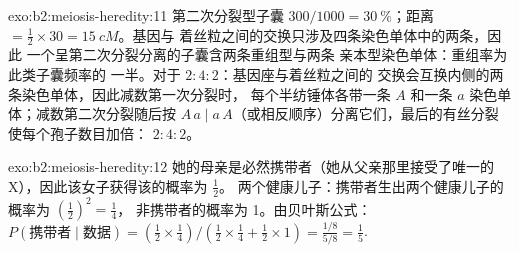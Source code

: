 \begin{solution}{exo:b2:meiosis-heredity:11}
第二次分裂型子囊 $300/1000 = \qty{30}{\%}$；距离 $=
\tfrac12\times 30 = \qty{15}{cM}$。基因与
着丝粒之间的交换只涉及四条染色单体中的两条，因此
一个呈第二次分裂分离的子囊含两条重组型与两条
亲本型染色单体：重组率为此类子囊频率的
一半。对于 $2 : 4 : 2$：基因座与着丝粒之间的
交换会互换内侧的两条染色单体，因此减数第一次分裂时，
每个半纺锤体各带一条 $A$ 和一条 $a$
染色单体；减数第二次分裂随后按 $A\,a \mid
a\,A$（或相反顺序）分离它们，最后的有丝分裂使每个孢子数目加倍：
$2 : 4 : 2$。
\end{solution}

\begin{solution}{exo:b2:meiosis-heredity:12}
她的母亲是必然携带者（她从父亲那里接受了唯一的
X），因此该女子获得该的概率为 $\tfrac12$。
两个健康儿子：携带者生出两个健康儿子的概率为 $(\tfrac12)^2 = \tfrac14$，
非携带者的概率为 1。由贝叶斯公式：
$P(\text{携带者}\mid\text{数据}) = (\tfrac12\times\tfrac14)/(\tfrac12
\times\tfrac14 + \tfrac12\times 1) = \tfrac{1/8}{5/8} = \tfrac15$.
\end{solution}


